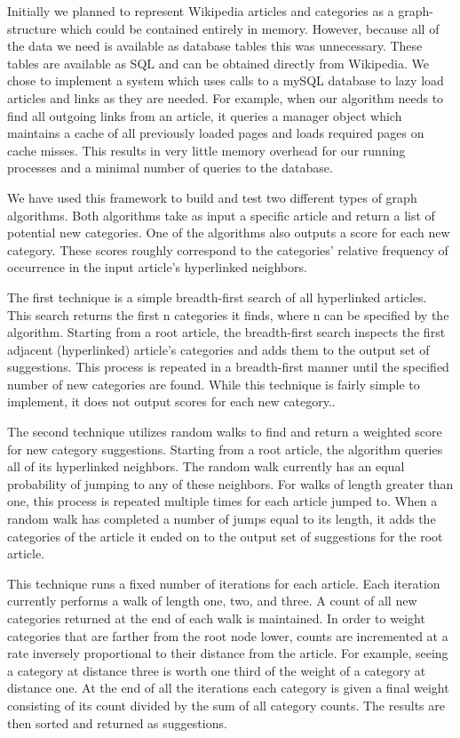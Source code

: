 \documentclass[]{sig-alternate}
\begin{document}
Initially we planned to represent Wikipedia articles and categories as a graph-structure which could be contained entirely in memory. However, because all of the data we need is available as database tables this was unnecessary. These tables are available as SQL and can be obtained directly from Wikipedia. We chose to implement a system which uses calls to a mySQL database to lazy load articles and links as they are needed. For example, when our algorithm needs to find all outgoing links from an article, it queries a manager object which maintains a cache of all previously loaded pages and loads required pages on cache misses. This results in very little memory overhead for our running processes and a minimal number of queries to the database.

We have used this framework to build and test two different types of graph algorithms. Both algorithms take as input a specific article and return a list of potential new categories. One of the algorithms also outputs a score for each new category. These scores roughly correspond to the categories' relative frequency of occurrence in the input article's hyperlinked neighbors.

The first technique is a simple breadth-first search of all hyperlinked articles. This search returns the first n categories it finds, where n can be specified by the algorithm. Starting from a root article, the breadth-first search inspects the first adjacent (hyperlinked) article's categories and adds them to the output set of suggestions. This process is repeated in a breadth-first manner until the specified number of new categories are found. While this technique is fairly simple to implement, it does not output scores for each new category..

The second technique utilizes random walks to find and return a weighted score for new category suggestions. Starting from a root article, the algorithm queries all of its hyperlinked neighbors. The random walk currently has an equal probability of jumping to any of these neighbors. For walks of length greater than one, this process is repeated multiple times for each article jumped to. When a random walk has completed a number of jumps equal to its length, it adds the categories of the article it ended on to the output set of suggestions for the root article.

This technique runs a fixed number of iterations for each article. Each iteration currently performs a walk of length one, two, and three. A count of all new categories returned at the end of each walk is maintained. In order to weight categories that are farther from the root node lower, counts are incremented at a rate inversely proportional to their distance from the article. For example, seeing a category at distance three is worth one third of the weight of a category at distance one. At the end of all the iterations each category is given a final weight consisting of its count divided by the sum of all category counts. The results are then sorted and returned as suggestions.
\end{document}
